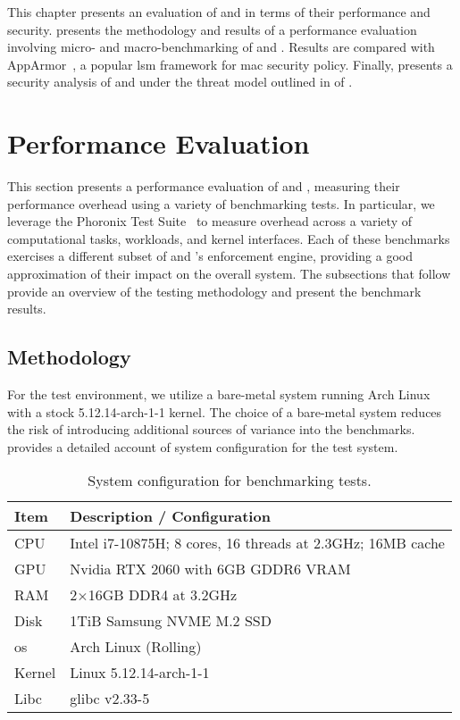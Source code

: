 This chapter presents an evaluation of \bpfbox{} and \bpfcontain{} in terms of their
performance and security.  presents the methodology and results
of a performance evaluation involving micro- and macro-benchmarking of \bpfbox{} and
\bpfcontain{}. Results are compared with AppArmor~\cite{cowan2000_apparmor}, a popular
\gls{lsm} framework for \gls{mac} security policy. Finally, 
presents a security analysis of \bpfbox{} and \bpfcontain{} under the threat model
outlined in  of .

\section{Performance Evaluation}%
\label{s:eval-performance}

This section presents a performance evaluation of \bpfbox{} and \bpfcontain{}, measuring
their performance overhead using a variety of benchmarking tests. In particular, we
leverage the Phoronix Test Suite~\cite{phoronix} to measure overhead across a variety of
computational tasks, workloads, and kernel interfaces. Each of these benchmarks exercises
a different subset of \bpfbox{} and \bpfcontain{}'s enforcement engine, providing a good
approximation of their impact on the overall system. The subsections that follow provide an
overview of the testing methodology and present the benchmark results.

\subsection{Methodology}%
\label{ss:eval-methodology}

For the test environment, we utilize a bare-metal system running Arch Linux with a stock
5.12.14-arch-1-1 kernel. The choice of a bare-metal system reduces the risk of introducing
additional sources of variance into the benchmarks.  provides
a detailed account of system configuration for the test system.

\begin{table}[htpb]
  \centering
  \caption[System configuration for benchmarking tests]{System configuration for benchmarking tests.}%
  \label{tab:system-config}
  \begin{tabular}{ll}
  \toprule
  Item & Description / Configuration \\
  \midrule
  CPU & Intel i7-10875H; 8 cores, 16 threads at 2.3GHz; 16MB cache\\
  GPU & Nvidia RTX 2060 with 6GB GDDR6 VRAM \\
  RAM & 2$\times$16GB DDR4 at 3.2GHz \\
  Disk & 1TiB Samsung NVME M.2 SSD \\
  \midrule
  \gls{os} & Arch Linux (Rolling) \\
  Kernel & Linux 5.12.14-arch-1-1 \\
  Libc & glibc v2.33-5 \\
  \bottomrule
  \end{tabular}
\end{table}

